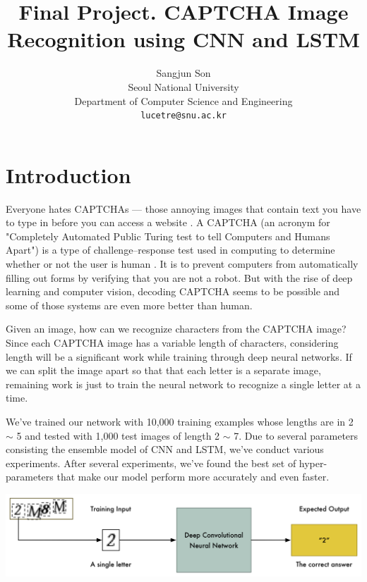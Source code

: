 \documentclass[10pt,twocolumn, letterpaper]{article}
\begin{document}
\title{Final Project. CAPTCHA Image Recognition using CNN and LSTM}

\author{Sangjun Son\\
Seoul National University\\
Department of Computer Science and Engineering\\
{\tt\small lucetre@snu.ac.kr}
}

\maketitle

\section{Introduction}

Everyone hates CAPTCHAs — those annoying images that contain text you have to type in before you can access a website \cite{captcha}. A CAPTCHA (an acronym for "Completely Automated Public Turing test to tell Computers and Humans Apart") is a type of challenge–response test used in computing to determine whether or not the user is human \cite{recaptcha}. It is to prevent computers from automatically filling out forms by verifying that you are not a robot. But with the rise of deep learning and computer vision, decoding CAPTCHA seems to be possible and some of those systems are even more better than human.

Given an image, how can we recognize characters from the CAPTCHA image? Since each CAPTCHA image has a variable length of characters, considering length will be a significant work while training through deep neural networks. If we can split the image apart so that that each letter is a separate image, remaining work is just to train the neural network to recognize a single letter at a time\cite{captcha}.

We've trained our network with 10,000 training examples whose lengths are in 2 $\sim$ 5 and tested with 1,000 test images of length 2 $\sim$ 7. Due to several parameters consisting the ensemble model of CNN and LSTM, we've conduct various experiments. After several experiments, we've found the best set of hyper-parameters that make our model perform more accurately and even faster.

\begin{center}
\includegraphics[width=1\linewidth]{./overview.png}
\end{center}
\end{document}
